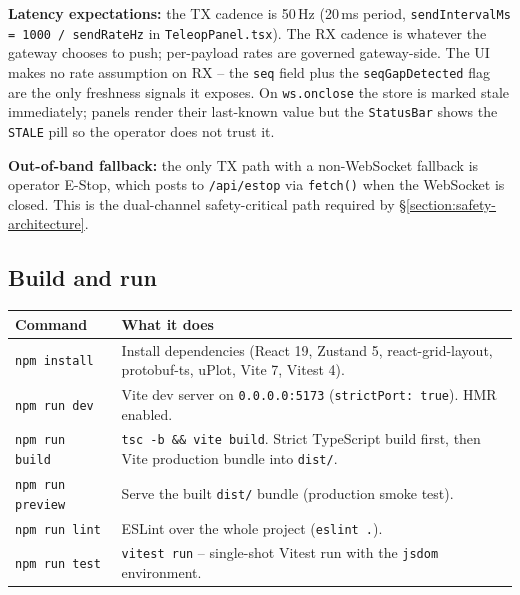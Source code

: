 \noindent\textbf{Latency expectations:} the TX cadence is 50\,Hz
(20\,ms period, \texttt{sendIntervalMs = 1000 / sendRateHz} in
\texttt{TeleopPanel.tsx}). The RX cadence is whatever the gateway
chooses to push; per-payload rates are governed gateway-side. The UI
makes no rate assumption on RX -- the \texttt{seq} field plus the
\texttt{seqGapDetected} flag are the only freshness signals it
exposes. On \texttt{ws.onclose} the store is marked stale immediately;
panels render their last-known value but the \texttt{StatusBar} shows
the \texttt{STALE} pill so the operator does not trust it.

\noindent\textbf{Out-of-band fallback:} the only TX path with a
non-WebSocket fallback is operator E-Stop, which posts to
\texttt{/api/estop} via \texttt{fetch()} when the WebSocket is closed.
This is the dual-channel safety-critical path required by
\S\ref{section:safety-architecture}.

\subsection{Build and run}

\begin{center}
\begin{tabular}{|p{3.4cm}|p{11.4cm}|}
\hline
\textbf{Command}                & \textbf{What it does}                                                                                                                       \\
\hline
\texttt{npm install}            & Install dependencies (React 19, Zustand 5, react-grid-layout, protobuf-ts, uPlot, Vite 7, Vitest 4).                                          \\
\texttt{npm run dev}            & Vite dev server on \texttt{0.0.0.0:5173} (\texttt{strictPort: true}). HMR enabled.                                                            \\
\texttt{npm run build}          & \texttt{tsc -b \&\& vite build}. Strict TypeScript build first, then Vite production bundle into \texttt{dist/}.                              \\
\texttt{npm run preview}        & Serve the built \texttt{dist/} bundle (production smoke test).                                                                                \\
\texttt{npm run lint}           & ESLint over the whole project (\texttt{eslint .}).                                                                                            \\
\texttt{npm run test}           & \texttt{vitest run} -- single-shot Vitest run with the \texttt{jsdom} environment.                                                            \\
\hline
\end{tabular}
\end{center}

